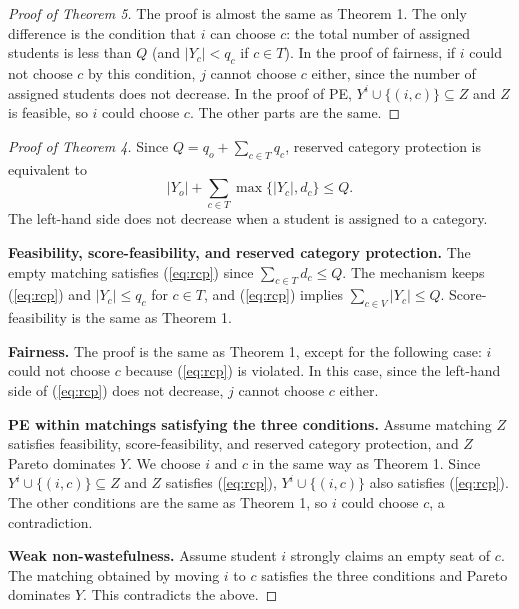 \documentclass{article}
\begin{document}
\begin{proof}[Proof of Theorem 5]
The proof is almost the same as Theorem 1.
The only difference is the condition that $i$ can choose $c$:
the total number of assigned students is less than $Q$ (and $|Y_c|<q_c$ if $c\in T$).
In the proof of fairness, if $i$ could not choose $c$ by this condition, $j$ cannot choose
$c$ either, since the number of assigned students does not decrease.
In the proof of PE, $Y^i\cup\{(i,c)\}\subseteq Z$ and $Z$ is feasible,
so $i$ could choose $c$.
The other parts are the same.
\end{proof}

\begin{proof}[Proof of Theorem 4]
Since $Q=q_o+\sum_{c\in T}q_c$, reserved category protection is equivalent to
\begin{equation}\label{eq:rcp}
|Y_o|+\sum_{c\in T}\max\{|Y_c|, d_c\}\le Q.
\end{equation}
The left-hand side does not decrease when a student is assigned to a category.

\textbf{Feasibility, score-feasibility, and reserved category protection.}
The empty matching satisfies (\ref{eq:rcp}) since $\sum_{c\in T}d_c\le Q$.
The mechanism keeps (\ref{eq:rcp}) and $|Y_c|\le q_c$ for $c\in T$, and
(\ref{eq:rcp}) implies $\sum_{c\in V}|Y_c|\le Q$.
Score-feasibility is the same as Theorem 1.

\textbf{Fairness.}
The proof is the same as Theorem 1, except for the following case:
$i$ could not choose $c$ because (\ref{eq:rcp}) is violated.
In this case, since the left-hand side of (\ref{eq:rcp}) does not decrease,
$j$ cannot choose $c$ either.

\textbf{PE within matchings satisfying the three conditions.}
Assume matching $Z$ satisfies feasibility, score-feasibility, and reserved category protection,
and $Z$ Pareto dominates $Y$.
We choose $i$ and $c$ in the same way as Theorem 1.
Since $Y^i\cup\{(i,c)\}\subseteq Z$ and $Z$ satisfies (\ref{eq:rcp}),
$Y^i\cup\{(i,c)\}$ also satisfies (\ref{eq:rcp}).
The other conditions are the same as Theorem 1, so $i$ could choose $c$, a contradiction.

\textbf{Weak non-wastefulness.}
Assume student $i$ strongly claims an empty seat of $c$.
The matching obtained by moving $i$ to $c$ satisfies the three conditions and
Pareto dominates $Y$. This contradicts the above.
\end{proof}
\end{document}
